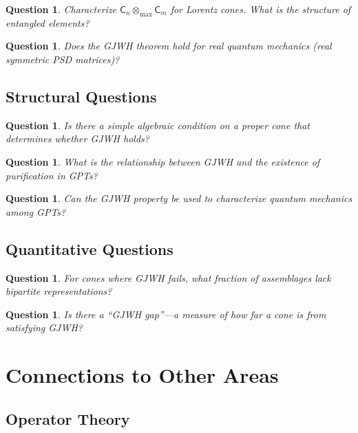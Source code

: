\documentclass[11pt,a4paper]{article}
\newtheorem{question}[theorem]{Question}
\theoremstyle{definition}
\newcommand{\C}{\mathsf{C}}
\newcommand{\tmax}{\otimes_{\max}}
\begin{document}
\begin{question}
Characterize $\C_n \tmax \C_m$ for Lorentz cones. What is the structure of entangled elements?
\end{question}

\begin{question}
Does the GJWH theorem hold for real quantum mechanics (real symmetric PSD matrices)?
\end{question}

\subsection{Structural Questions}

\begin{question}
Is there a simple algebraic condition on a proper cone that determines whether GJWH holds?
\end{question}

\begin{question}
What is the relationship between GJWH and the existence of purification in GPTs?
\end{question}

\begin{question}
Can the GJWH property be used to characterize quantum mechanics among GPTs?
\end{question}

\subsection{Quantitative Questions}

\begin{question}
For cones where GJWH fails, what fraction of assemblages lack bipartite representations?
\end{question}

\begin{question}
Is there a ``GJWH gap''---a measure of how far a cone is from satisfying GJWH?
\end{question}

\section{Connections to Other Areas}

\subsection{Operator Theory}
\end{document}
